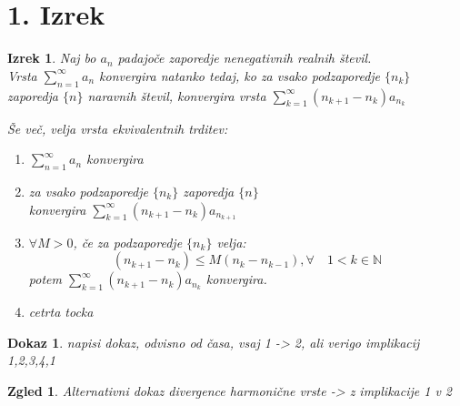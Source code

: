 \documentclass{beamer}
\newtheorem{izrek}{Izrek}
\newtheorem{zgled}{Zgled}
\newtheorem{dokaz}{Dokaz}
\begin{document}
\section{1. Izrek}

\begin{frame}
    \begin{izrek}
        Naj bo ${a_n}$ padajoče zaporedje nenegativnih realnih števil. \\
        
        \vspace{0.15cm}
        Vrsta $\sum_{n = 1}^{\infty}{a_n}$ konvergira natanko tedaj, ko za vsako 
        podzaporedje $\{n_k\}$ zaporedja $\{n\}$ naravnih števil, konvergira vrsta 
        $\sum_{k = 1}^{\infty}{(n_{k+1} - n_k)a_{n_{k}}}$

        \vspace{0.35cm}
        \pause
        Še več, velja vrsta ekvivalentnih trditev:
        \begin{enumerate}
            \item $\sum_{n = 1}^{\infty}{a_n}$ konvergira
            \item za vsako podzaporedje $\{n_k\}$ zaporedja $\{n\}$ \\
            konvergira $\sum_{k = 1}^{\infty}{(n_{k+1} - n_k)a_{n_{k + 1}}}$
            \item $\forall M > 0$, če za podzaporedje $\{n_k\}$ velja:
            \[
                (n_{k+1} - n_k) \leq M(n_k - n_{k - 1}),  \forall \quad 1 < k \in {\mathbb{N}} 
            \]
            potem $\sum_{k = 1}^{\infty}{(n_{k+1} - n_k)a_{n_{k}}}$ konvergira.
            \item cetrta tocka
        \end{enumerate}
    \end{izrek}
    
\end{frame}
\begin{frame}
    \begin{dokaz}
        napisi dokaz, odvisno od časa, vsaj 1 -> 2, ali verigo implikacij 1,2,3,4,1
    \end{dokaz}
\end{frame}

\begin{frame}
    \begin{zgled}
        Alternativni dokaz divergence harmonične vrste -> z implikacije 1 v 2
    \end{zgled}
\end{frame}
\end{document}
